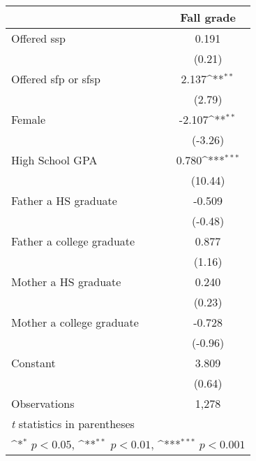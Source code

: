 {
\def\sym#1{\ifmmode^{#1}\else\(^{#1}\)\fi}
\begin{tabular}{l*{1}{c}}
\hline\hline
                &\multicolumn{1}{c}{Fall grade}\\
\hline
Offered ssp     &    0.191         \\
                &   (0.21)         \\
Offered sfp or sfsp&    2.137\sym{**} \\
                &   (2.79)         \\
Female          &   -2.107\sym{**} \\
                &  (-3.26)         \\
High School GPA &    0.780\sym{***}\\
                &  (10.44)         \\
Father a HS graduate&   -0.509         \\
                &  (-0.48)         \\
Father a college graduate&    0.877         \\
                &   (1.16)         \\
Mother a HS graduate&    0.240         \\
                &   (0.23)         \\
Mother a college graduate&   -0.728         \\
                &  (-0.96)         \\
Constant        &    3.809         \\
                &   (0.64)         \\
\hline
Observations    &    1,278         \\
\hline\hline
\multicolumn{2}{l}{\footnotesize \textit{t} statistics in parentheses}\\
\multicolumn{2}{l}{\footnotesize \sym{*} \(p<0.05\), \sym{**} \(p<0.01\), \sym{***} \(p<0.001\)}\\
\end{tabular}
}
